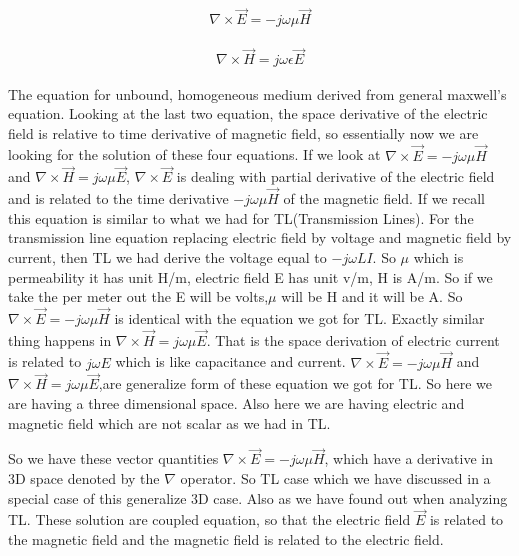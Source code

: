		\begin{align}
		\nabla \times \vec{E}=-j\omega\mu\vec{H}
		\end{align}
		
		\begin{align}
		\nabla\times\vec{H}=j\omega\epsilon\vec{E}
		\end{align}
		
		
		
		\bigskip
		
		The equation for unbound, homogeneous medium derived from general maxwell's equation. Looking at the last two equation, the space derivative of the electric field is relative to time derivative of magnetic field, so essentially now we are looking for the solution of these four equations. If we look  at $\nabla\times\vec{E}=-j\omega\mu\vec{H}$ and $\nabla\times\vec{H}=j\omega\mu\vec{E}$, $\nabla\times\vec{E}$ is dealing with partial derivative of the electric field and is related to the time derivative $-j\omega\mu\vec{H}$ of the magnetic field. If we recall this equation is similar to what we had for TL(Transmission Lines). For the transmission line equation replacing electric field by voltage and magnetic field by current, then TL we had derive the voltage equal to $-j\omega LI$. So $\mu$ which is permeability it has unit H/m, electric field E has unit v/m, H is A/m. So if we take the per meter out the E will be volts,$\mu$ will be H and it will be A. So $\nabla\times\vec{E}=-j\omega\mu\vec{H}$ is identical with the equation we got for TL. Exactly similar thing happens in $\nabla\times\vec{H}=j\omega\mu\vec{E}$. That is the space derivation of electric current is related to $j\omega E$ which is like capacitance and current. $\nabla\times\vec{E}=-j\omega\mu\vec{H}$ and $\nabla\times\vec{H}=j\omega\mu\vec{E}$,are generalize form of these equation we got for TL. So here we are having a three dimensional space. Also here we are having electric and magnetic field which are not scalar as we had in TL.
		
		\bigskip
		
		
		
		So we have these vector quantities $\nabla\times\vec{E}=-j\omega\mu\vec{H}$, which have a derivative in 3D space denoted by the $\nabla$ operator. So TL case which we have discussed in a special case of this generalize 3D case. Also as we have found out when analyzing TL. These solution are coupled equation, so that the electric field $\vec{E}$ is related to the magnetic field and the magnetic field is related to the electric field.
		
